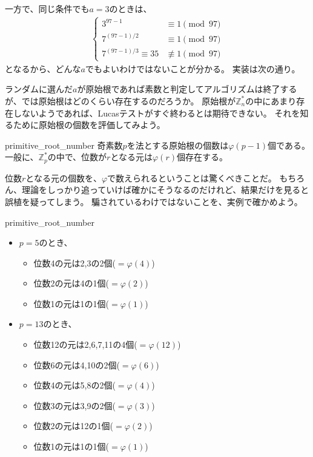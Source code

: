 一方で、同じ条件でも$a=3$のときは、
\begin{align*}
\begin{cases}
3^{97-1} &\equiv 1 \pmod{97}\\
7^{(97-1)/2}  &\equiv 1 \pmod{97}\\
7^{(97-1)/3}  \equiv 35 &\not\equiv 1 \pmod{97}
\end{cases}
\end{align*}
となるから、どんな$a$でもよいわけではないことが分かる。
実装は次の通り。


ランダムに選んだ$a$が原始根であれば素数と判定してアルゴリズムは終了するが、では原始根はどのくらい存在するのだろうか。
原始根が$\mathbb{Z}_n^*$の中にあまり存在しないようであれば、Lucasテストがすぐ終わるとは期待できない。
それを知るために原始根の個数を評価してみよう。

\begin{Prop}{}{primitive_root_number}
奇素数$p$を法とする原始根の個数は$\varphi(p-1)$個である。
一般に、$\mathbb{Z}_p^*$の中で、位数が$r$となる元は$\varphi(r)$個存在する。
\end{Prop}

位数$r$となる元の個数を、$\varphi$で数えられるということは驚くべきことだ。
もちろん、理論をしっかり追っていけば確かにそうなるのだけれど、結果だけを見ると誤植を疑ってしまう。
騙されているわけではないことを、実例で確かめよう。

\begin{Exam}{}{primitive_root_number}\;
\begin{itemize}
 \item $p=5$のとき、
  \begin{itemize}
   \item 位数4の元は2,3の2個($=\varphi(4)$)
   \item 位数2の元は4の1個($=\varphi(2)$)
   \item 位数1の元は1の1個($=\varphi(1)$)
  \end{itemize}
  \item $p=13$のとき、
  \begin{itemize}
   \item 位数12の元は2,6,7,11の4個($=\varphi(12)$)
   \item 位数6の元は4,10の2個($=\varphi(6)$)
   \item 位数4の元は5,8の2個($=\varphi(4)$)
   \item 位数3の元は3,9の2個($=\varphi(3)$)
   \item 位数2の元は12の1個($=\varphi(2)$)
   \item 位数1の元は1の1個($=\varphi(1)$)
  \end{itemize}
\end{itemize}
\end{Exam}

